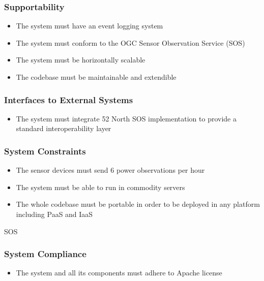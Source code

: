 \subsubsection*{Supportability}

\begin{itemize}
	\item The system must have an event logging system
	\item The system must conform to the OGC Sensor Observation Service (SOS)
	\item The system must be horizontally scalable
	\item The codebase must be maintainable and extendible
\end{itemize}

\subsubsection*{Interfaces to External Systems}

\begin{itemize}
	\item The system must integrate 52 North SOS implementation to provide a standard interoperability layer
\end{itemize}

\subsubsection*{System Constraints}

\begin{itemize}
	\item The sensor devices must send 6 power observations per hour
	\item The system must be able to run in commodity servers 
	\item The whole codebase must be portable in order to be deployed in any platform including PaaS and IaaS
\end{itemize}

SOS

\subsubsection*{System Compliance}

\begin{itemize}
	\item The system and all its components must adhere to Apache license
\end{itemize}




